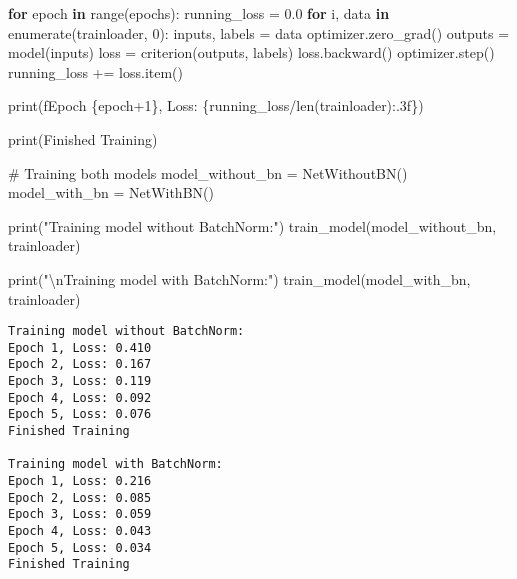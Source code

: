 \documentclass[
  letterpaper,
  DIV=11,
  numbers=noendperiod]{scrreprt}
\newenvironment{Shaded}{\begin{snugshade}}{\end{snugshade}}
\newcommand{\BuiltInTok}[1]{\textcolor[rgb]{0.00,0.23,0.31}{#1}}
\newcommand{\CharTok}[1]{\textcolor[rgb]{0.13,0.47,0.30}{#1}}
\newcommand{\CommentTok}[1]{\textcolor[rgb]{0.37,0.37,0.37}{#1}}
\newcommand{\ControlFlowTok}[1]{\textcolor[rgb]{0.00,0.23,0.31}{\textbf{#1}}}
\newcommand{\DecValTok}[1]{\textcolor[rgb]{0.68,0.00,0.00}{#1}}
\newcommand{\FloatTok}[1]{\textcolor[rgb]{0.68,0.00,0.00}{#1}}
\newcommand{\KeywordTok}[1]{\textcolor[rgb]{0.00,0.23,0.31}{\textbf{#1}}}
\newcommand{\NormalTok}[1]{\textcolor[rgb]{0.00,0.23,0.31}{#1}}
\newcommand{\OperatorTok}[1]{\textcolor[rgb]{0.37,0.37,0.37}{#1}}
\newcommand{\SpecialCharTok}[1]{\textcolor[rgb]{0.37,0.37,0.37}{#1}}
\newcommand{\SpecialStringTok}[1]{\textcolor[rgb]{0.13,0.47,0.30}{#1}}
\newcommand{\StringTok}[1]{\textcolor[rgb]{0.13,0.47,0.30}{#1}}
\begin{document}
\begin{Shaded}
\begin{Highlighting}[]
    \ControlFlowTok{for}\NormalTok{ epoch }\KeywordTok{in} \BuiltInTok{range}\NormalTok{(epochs):}
\NormalTok{        running\_loss }\OperatorTok{=} \FloatTok{0.0}
        \ControlFlowTok{for}\NormalTok{ i, data }\KeywordTok{in} \BuiltInTok{enumerate}\NormalTok{(trainloader, }\DecValTok{0}\NormalTok{):}
\NormalTok{            inputs, labels }\OperatorTok{=}\NormalTok{ data}
\NormalTok{            optimizer.zero\_grad()}
\NormalTok{            outputs }\OperatorTok{=}\NormalTok{ model(inputs)}
\NormalTok{            loss }\OperatorTok{=}\NormalTok{ criterion(outputs, labels)}
\NormalTok{            loss.backward()}
\NormalTok{            optimizer.step()}
\NormalTok{            running\_loss }\OperatorTok{+=}\NormalTok{ loss.item()}
            
        \BuiltInTok{print}\NormalTok{(}\SpecialStringTok{f\textquotesingle{}Epoch }\SpecialCharTok{\{}\NormalTok{epoch}\OperatorTok{+}\DecValTok{1}\SpecialCharTok{\}}\SpecialStringTok{, Loss: }\SpecialCharTok{\{}\NormalTok{running\_loss}\OperatorTok{/}\BuiltInTok{len}\NormalTok{(trainloader)}\SpecialCharTok{:.3f\}}\SpecialStringTok{\textquotesingle{}}\NormalTok{)}
    
    \BuiltInTok{print}\NormalTok{(}\StringTok{\textquotesingle{}Finished Training\textquotesingle{}}\NormalTok{)}

\CommentTok{\# Training both models}
\NormalTok{model\_without\_bn }\OperatorTok{=}\NormalTok{ NetWithoutBN()}
\NormalTok{model\_with\_bn }\OperatorTok{=}\NormalTok{ NetWithBN()}

\BuiltInTok{print}\NormalTok{(}\StringTok{"Training model without BatchNorm:"}\NormalTok{)}
\NormalTok{train\_model(model\_without\_bn, trainloader)}

\BuiltInTok{print}\NormalTok{(}\StringTok{"}\CharTok{\textbackslash{}n}\StringTok{Training model with BatchNorm:"}\NormalTok{)}
\NormalTok{train\_model(model\_with\_bn, trainloader)}
\end{Highlighting}
\end{Shaded}

\begin{verbatim}
Training model without BatchNorm:
Epoch 1, Loss: 0.410
Epoch 2, Loss: 0.167
Epoch 3, Loss: 0.119
Epoch 4, Loss: 0.092
Epoch 5, Loss: 0.076
Finished Training

Training model with BatchNorm:
Epoch 1, Loss: 0.216
Epoch 2, Loss: 0.085
Epoch 3, Loss: 0.059
Epoch 4, Loss: 0.043
Epoch 5, Loss: 0.034
Finished Training
\end{verbatim}
\end{document}

